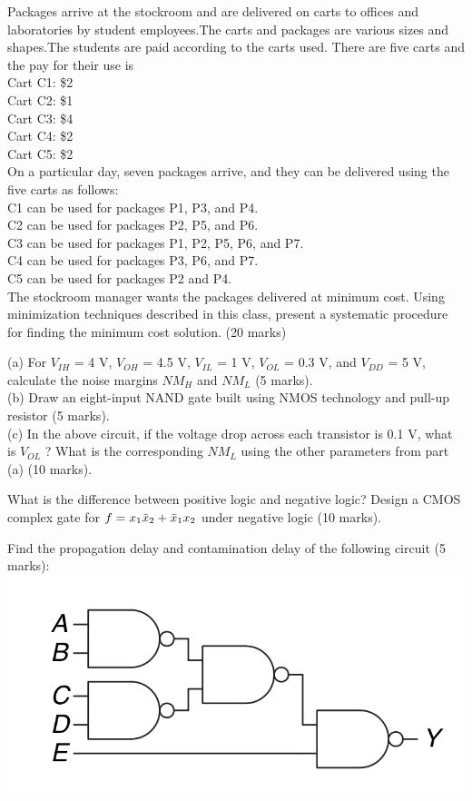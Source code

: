 \begin{prob}
  Packages arrive at the stockroom and are delivered on carts to offices and laboratories
  by student employees.The carts and packages are various sizes and shapes.The students
  are paid according to the carts used. There are five carts and the pay for their use is\\
  Cart C1: \$2\\
  Cart C2: \$1\\
  Cart C3: \$4\\
  Cart C4: \$2\\
  Cart C5: \$2\\
  On a particular day, seven packages arrive, and they can be delivered using the five
  carts as follows:\\
  C1 can be used for packages P1, P3, and P4. \\
  C2 can be used for packages P2, P5, and P6. \\
  C3 can be used for packages P1, P2, P5, P6, and P7. \\
  C4 can be used for packages P3, P6, and P7. \\
  C5 can be used for packages P2 and P4. \\
  The stockroom manager wants the packages delivered at minimum cost. Using
  minimization techniques described in this class, present a systematic procedure for
  finding the minimum cost solution. (20 marks)
\end{prob}
\newpage

\begin{prob}
  (a) For $V_{IH}$ = 4 V, $V_{OH}$ = 4.5 V, $V_{IL}$ = 1 V, $V_{OL}$ = 0.3 V, and $V_{DD}$ = 5 V, calculate the
  noise margins $NM_H$ and $NM_L$ (5 marks).\\
  (b) Draw an eight-input NAND gate built using NMOS technology and pull-up
  resistor (5 marks).\\
  (c) In the above circuit, if the voltage drop
  across each transistor is 0.1 V, what is $V_{OL}$ ? What is the corresponding $NM_L$ using the other
  parameters from part (a) (10 marks).
\end{prob}
\newpage

\begin{prob}
  What is the difference between positive logic and negative logic? Design a
  CMOS complex gate for $f = x_1 \bar{x}_2 + \bar{x}_1 x_2$ under negative logic (10 marks).
\end{prob}
\newpage

\begin{prob}
  Find the propagation delay and contamination  delay of the following circuit (5 marks):\\
  \includegraphics[width=0.4\linewidth]{./fig/fig2.83-circuit.png} 
\end{prob}
\newpage


